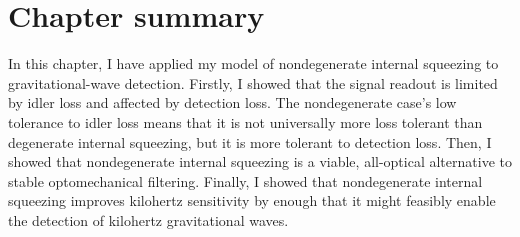 \section{Chapter summary}

In this chapter, I have applied my model of nondegenerate internal squeezing to gravitational-wave detection. %
Firstly, I showed that the signal readout is limited by idler loss and affected by detection loss. %
The nondegenerate case's low tolerance to idler loss means that it is not universally more loss tolerant than degenerate internal squeezing, but it is more tolerant to detection loss. %
Then, I showed that nondegenerate internal squeezing is a viable, all-optical alternative to stable optomechanical filtering. %
Finally, I showed that nondegenerate internal squeezing improves kilohertz sensitivity by enough that it might feasibly enable the detection of kilohertz gravitational waves. %



